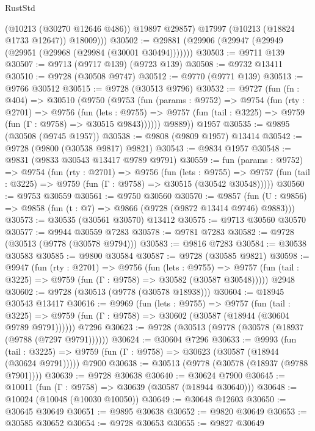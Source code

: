 \begin{lexlean}{RustStd}
\begin{coremodule}
            (@10213 (@30270 @12646 @486))
            @19897
            @29857)
          @17997
          (@10213 (@18824 @1733 @12647))
          @18009)))
@30502 := @29881 (@29906 (@29947 (@29949 (@29951 (@29968 (@29984 (@30001 @30494)))))))
@30503 := @9711 @139
@30507 := @9713 (@9717 @139) (@9723 @139)
@30508 := @9732 @13411
@30510 := @9728 (@30508 @9747)
@30512 := @9770 (@9771 @139)
@30513 := @9766 @30512
@30515 := @9728 (@30513 @9796)
@30532 := @9727
    (fun (fn : @404) =>
    @30510
      (@9750
        (@9753
          (fun (params : @9752) =>
          @9754
            (fun (rty : @2701) =>
            @9756
              (fun (lets : @9755) =>
              @9757 (fun (tail : @3225) => @9759 (fun (Γ : @9758) => @30515 @9843))))))
        @9889))
    @1957
@30535 := @9895 (@30508 (@9745 @1957))
@30538 := @9808 (@9809 @1957) @13414
@30542 := @9728 (@9800 (@30538 @9817) @9821)
@30543 := @9834 @1957
@30548 := @9831 (@9833 @30543 @13417 @9789 @9791)
@30559 := fun (params : @9752) =>
  @9754
    (fun (rty : @2701) =>
    @9756
      (fun (lets : @9755) =>
      @9757 (fun (tail : @3225) => @9759 (fun (Γ : @9758) => @30515 (@30542 @30548)))))
@30560 := @9753 @30559
@30561 := @9750 @30560
@30570 := @9857
    (fun (U : @9856) => @9858 (fun (t : @7) => @9866 (@9728 (@9872 @13414 @9746) @9883)))
@30573 := @30535 (@30561 @30570) @13412
@30575 := @9713 @30560 @30570
@30577 := @9944 @30559 @7283
@30578 := @9781 @7283
@30582 := @9728 (@30513 (@9778 (@30578 @9794)))
@30583 := @9816 @7283
@30584 := @30538 @30583
@30585 := @9800 @30584
@30587 := @9728 (@30585 @9821)
@30598 := @9947
    (fun (rty : @2701) =>
    @9756
      (fun (lets : @9755) =>
      @9757 (fun (tail : @3225) => @9759 (fun (Γ : @9758) => @30582 (@30587 @30548)))))
    @2948
@30602 := @9728 (@30513 (@9778 (@30578 @18938)))
@30604 := @18945 @30543 @13417
@30616 := @9969
    (fun (lets : @9755) =>
    @9757
      (fun (tail : @3225) =>
      @9759 (fun (Γ : @9758) => @30602 (@30587 (@18944 (@30604 @9789 @9791))))))
    @7296
@30623 := @9728 (@30513 (@9778 (@30578 (@18937 (@9788 (@7297 @9791))))))
@30624 := @30604 @7296
@30633 := @9993
    (fun (tail : @3225) => @9759 (fun (Γ : @9758) => @30623 (@30587 (@18944 (@30624 @9791)))))
    @7900
@30638 := @30513 (@9778 (@30578 (@18937 (@9788 @7901))))
@30639 := @9728 @30638
@30640 := @30624 @7900
@30645 := @10011 (fun (Γ : @9758) => @30639 (@30587 (@18944 @30640)))
@30648 := @10024 (@10048 (@10030 @10050))
@30649 := @30648 @12603
@30650 := @30645 @30649
@30651 := @9895 @30638
@30652 := @9820 @30649
@30653 := @30585 @30652
@30654 := @9728 @30653
@30655 := @9827 @30649

\end{coremodule}
\end{lexlean}
